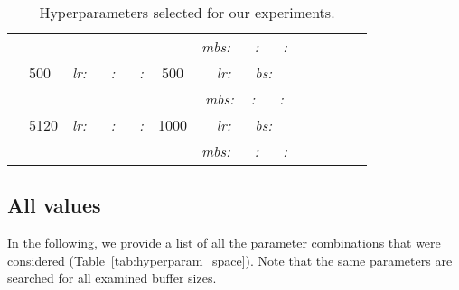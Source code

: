 \documentclass{article}
\begin{document}
\begin{table}[H]
\begin{tabular}{| Sl | Sc | Sl | Sc | Sl |}
        & & & & \textit{mbs:}  ~~ \textit{:}  ~~ \textit{:}  \\
        & 500    & \textit{lr:}   ~~ \textit{:}  ~~ \textit{:}  & 500    & \textit{lr:}  ~~ \textit{bs:}  \\
        & & & & \textit{mbs:}  ~ \textit{:}  ~~ \textit{:}  \\
        & 5120   & \textit{lr:}   ~~ \textit{:}  ~~ \textit{:}  & 1000   & \textit{lr:}  ~~ \textit{bs:}  \\
        & & & & \textit{mbs:}  ~~ \textit{:}  ~~ \textit{:}  \\
\hline
\end{tabular}
\vspace{0.8em}
\caption{Hyperparameters selected for our experiments.}
\label{tab:hyperparams}
\end{table} 
\subsection{All values}
In the following, we provide a list of all the parameter combinations that were considered (Table~\ref{tab:hyperparam_space}). Note that the same parameters are searched for all examined buffer sizes.
\end{document}

